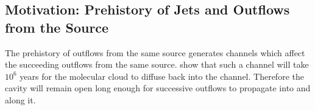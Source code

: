 \subsection{Motivation: Prehistory of Jets and Outflows from the Source}

The prehistory of outflows from the same source generates channels which affect the succeeding outflows from the same source.
\citet{2005ApJ...632..941Q} show that such a channel will take $10^6$ years for the molecular cloud to diffuse back into the channel. Therefore the cavity will remain open long enough for successive outflows to propagate into and along it. 


